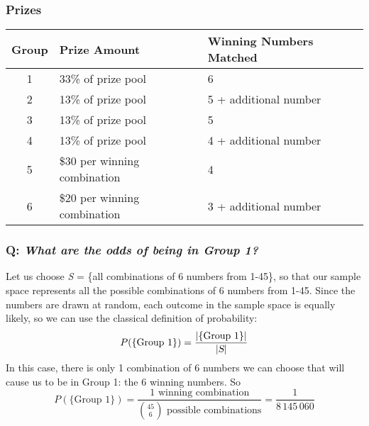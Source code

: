 \documentclass{article}
\begin{document}
\subsubsection*{Prizes}
\begin{tabular}{|c|l|l|}\hline
Group&Prize Amount&Winning Numbers Matched\\\hline\hline
1&33\% of prize pool&6\\\hline
2&13\% of prize pool&5 + additional number\\\hline
3&13\% of prize pool&5\\\hline
4&13\% of prize pool&4 + additional number\\\hline
5&\$30 per winning combination&4\\\hline
6&\$20 per winning combination&3 + additional number\\\hline
\end{tabular}

\subsubsection*{Q: {\em What are the odds of being in Group 1?}}
Let us choose \textsl{S} = \{all combinations of 6 numbers from 1-45\}, so that our sample space represents all the possible combinations of 6 numbers from 1-45. Since the numbers are drawn at random, each outcome in the sample space is equally likely, so we can use the classical definition of probability:
\begin{equation*}
P(\{\text{Group 1}\})=\dfrac{|\{\text{Group 1}\}|}{|\textsl{S}|}
\end{equation*}
In this case, there is only 1 combination of 6 numbers we can choose that will cause us to be in Group 1: the 6 winning numbers. So
\begin{equation*}
P(\{\text{Group 1}\})=\dfrac{1\text{ winning combination}}{\binom{45}{6}\text{ possible combinations}}=\dfrac{1}{8\,145\,060}
\end{equation*}
\end{document}
